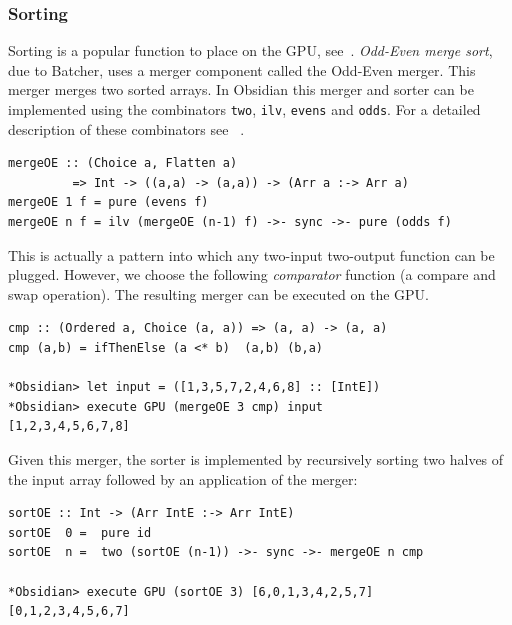 \subsubsection{Sorting}

Sorting is a popular function to place on the GPU, see~.
{\em Odd-Even merge sort}, due to Batcher, uses a merger component called the Odd-Even merger. This 
merger merges two sorted arrays. In Obsidian this merger and sorter 
can be implemented using the combinators {\tt two}, {\tt ilv}, {\tt evens}
and {\tt odds}. For a detailed description of these combinators see
~.

\begin{small}
\begin{verbatim}
mergeOE :: (Choice a, Flatten a) 
         => Int -> ((a,a) -> (a,a)) -> (Arr a :-> Arr a)
mergeOE 1 f = pure (evens f)
mergeOE n f = ilv (mergeOE (n-1) f) ->- sync ->- pure (odds f)
\end{verbatim}
\end{small}
\noindent
This is actually a pattern into which any two-input two-output function
can be plugged. However, we choose the following {\em comparator} function (a compare and swap operation). The resulting merger can be executed on the GPU.

\pagebreak

\begin{small}
\begin{verbatim}
cmp :: (Ordered a, Choice (a, a)) => (a, a) -> (a, a)
cmp (a,b) = ifThenElse (a <* b)  (a,b) (b,a)

*Obsidian> let input = ([1,3,5,7,2,4,6,8] :: [IntE]) 
*Obsidian> execute GPU (mergeOE 3 cmp) input
[1,2,3,4,5,6,7,8]
\end{verbatim}
\end{small}
\noindent
Given this merger, the sorter is implemented by recursively sorting 
two halves of the input array followed by an application of the merger:

\begin{small}
\begin{verbatim}
sortOE :: Int -> (Arr IntE :-> Arr IntE)
sortOE  0 =  pure id
sortOE  n =  two (sortOE (n-1)) ->- sync ->- mergeOE n cmp 

*Obsidian> execute GPU (sortOE 3) [6,0,1,3,4,2,5,7]
[0,1,2,3,4,5,6,7]
\end{verbatim}
\end{small}

